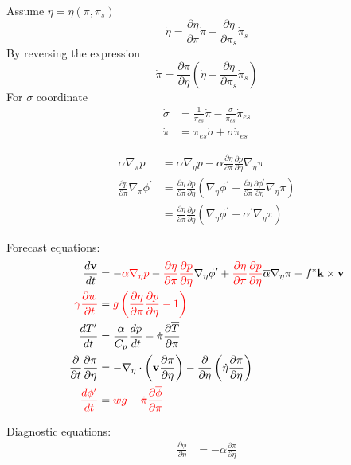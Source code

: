 \documentclass[12pt]{article}
\renewcommand{\d}[2]{\frac{d #1}{d #2}}
\newcommand{\dt}[1]{\d{#1}{t}}
\newcommand{\pd}[2]{\frac{\partial #1}{\partial #2}}
\newcommand{\pdt}[1]{\pd{#1}{t}}
\renewcommand{\vec}[1]{\mathbf{#1}}
\newcommand{\grad}[2][\pi]{\nabla_{#1} #2}
\renewcommand{\div}[2][\pi]{\nabla_{#1} \cdot #2}
\begin{document}
\pagebreak
Assume $\eta = \eta\left(\pi, \pi_{s}\right)$
\begin{equation*}
  \dot{\eta} = \pd{\eta}{\pi} \dot{\pi} + \pd{\eta}{\pi_s} \dot{\pi}_s
\end{equation*}
By reversing the expression
\begin{equation*}
  \dot{\pi} = \pd{\pi}{\eta} \left(\dot{\eta} - \pd{\eta}{\pi_s} \dot{\pi}_s\right)
\end{equation*}
For $\sigma$ coordinate
\begin{align*}
  \dot{\sigma} & = \frac{1}{\pi_{es}} \dot{\pi} - \frac{\sigma}{\pi_{es}} \dot{\pi}_{es} \\
  \dot{\pi} & = \pi_{es} \dot{\sigma} + \sigma \dot{\pi}_{es}
\end{align*}

\begin{align*}
  \alpha \grad[\pi]{p} & = \alpha \grad[\eta]{p} - \alpha \pd{\eta}{\pi} \pd{p}{\eta} \grad[\eta]{\pi} \\
  \pd{p}{\pi} \grad[\pi]{\phi^\prime} & = \pd{\eta}{\pi} \pd{p}{\eta} \left(\grad[\eta]{\phi^\prime} - \pd{\eta}{\pi} \pd{\phi^\prime}{\eta} \grad[\eta]{\pi}\right) \\
  & = \pd{\eta}{\pi} \pd{p}{\eta} \left(\grad[\eta]{\phi^\prime} + \alpha^\prime \grad[\eta]{\pi}\right)
\end{align*}

Forecast equations:
\begin{align*}
  \dt{\vec{v}} & = - {\color{red}\alpha \grad[\eta]{p}} - {\color{red}\pd{\eta}{\pi} \pd{p}{\eta}} \grad[\eta]{\phi^\prime} + {\color{red}\pd{\eta}{\pi} \pd{p}{\eta}} \overline{\alpha} \grad[\eta]{\pi} - f^* \vec{k} \times \vec{v} \\
  {\color{red}\gamma \pdt{w}} & = {\color{red}g \left(\pd{\eta}{\pi} \pd{p}{\eta} - 1\right)} \\
  \dt{T^\prime} & = \frac{\alpha}{C_p} \dt{p} - \dot{\pi} \pd{\overline{T}}{\pi} \\
  \pdt{} \pd{\pi}{\eta} & = - \div[\eta]{\left(\vec{v} \pd{\pi}{\eta}\right)} - \pd{}{\eta} \left(\dot{\eta} \pd{\pi}{\eta}\right) \\
  {\color{red}\dt{\phi^\prime}} & = {\color{red}w g - \dot{\pi} \pd{\overline{\phi}}{\pi}}
\end{align*}

Diagnostic equations:
\begin{align*}
  \pd{\phi}{\eta} & = - \alpha \pd{\pi}{\eta}
\end{align*}
\end{document}

